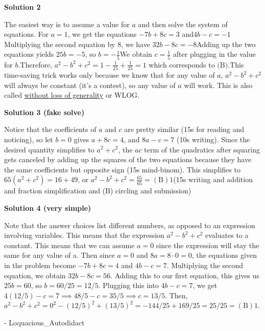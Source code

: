 \begin{enumerate}
\textbf{Solution 2}

The easiest way is to assume a value for $a$ and then solve the system of equations. For $a = 1$, we get the equations $-7b + 8c = 3$ and$4b - c = -1$Multiplying the second equation by $8$, we have $32b - 8c = -8$Adding up the two equations yields $25b = -5$, so $b = -\frac{1}{5}$We obtain $c = \frac{1}{5}$ after plugging in the value for $b$.Therefore, $a^2-b^2+c^2 = 1-\frac{1}{25}+\frac{1}{25}=\boxed{1}$ which corresponds to $\text{(B)}$.This time-saving trick works only because we know that for any value of $a$, $a^2-b^2+c^2$ will always be constant (it's a contest), so any value of $a$ will work. This is also called \href{https://artofproblemsolving.com/wiki/index.php?title=Without\_loss\_of\_generality}{without loss of generality} or WLOG.

 



\textbf{Solution 3 (fake solve)}

Notice that the coefficients of $a$ and $c$ are pretty similar (15s for reading and noticing), so let $b=0$ gives $a+8c=4$, and $8a-c=7$ (10s writing). Since the desired quantity simplifies to $a^2+c^2$, the $ac$ term of the quadratics after squaring gets canceled by adding up the squares of the two equations because they have the same coefficients but opposite sign (15s mind-binom). This simplifies to $65(a^2+c^2)=16+49$, or $a^2-b^2+c^2=\frac{65}{65}=\boxed{(\text{B})1}$(15s writing and addition and fraction simplification and (B) circling and submission)

 



\textbf{Solution 4 (very simple)}

Note that the answer choices list different numbers, as opposed to an expression involving variables. This means that the expression $a^2-b^2+c^2$ evaluates to a constant. This means that we can assume $a = 0$ since the expression will stay the same for any value of a. Then since $a = 0$ and $8a = 8 \cdot 0 = 0$, the equations given in the problem become $-7b + 8c = 4$ and $4b - c = 7$. Multiplying the second equation, we obtain $32b - 8c = 56$. Adding this to our first equation, this gives us $25b = 60$, so $b = 60/25 = 12/5$. Plugging this into $4b - c = 7$, we get $4(12/5) - c = 7 \implies 48/5 - c = 35/5 \implies c = 13/5$. Then, $a^2-b^2+c^2 = 0^2 - (12/5)^2 + (13/5)^2 = -144/25 + 169/25 = 25/25 = \boxed{(\text{B})1}$.

 
- Loquacious\_Autodidact


\end{enumerate}
